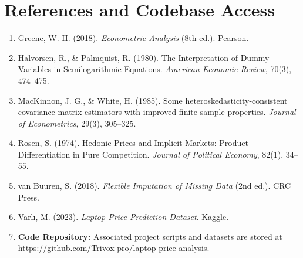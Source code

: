 \documentclass[11pt, a4paper]{article}
\begin{document}
\section{References and Codebase Access}

\begin{enumerate}
    \item Greene, W. H. (2018). \textit{Econometric Analysis} (8th ed.). Pearson.
    \item Halvorsen, R., \& Palmquist, R. (1980). The Interpretation of Dummy Variables in Semilogarithmic Equations. \textit{American Economic Review}, 70(3), 474--475.
    \item MacKinnon, J. G., \& White, H. (1985). Some heteroskedasticity-consistent covariance matrix estimators with improved finite sample properties. \textit{Journal of Econometrics}, 29(3), 305--325.
    \item Rosen, S. (1974). Hedonic Prices and Implicit Markets: Product Differentiation in Pure Competition. \textit{Journal of Political Economy}, 82(1), 34--55.
    \item van Buuren, S. (2018). \textit{Flexible Imputation of Missing Data} (2nd ed.). CRC Press.
    \item Varlı, M. (2023). \textit{Laptop Price Prediction Dataset}. Kaggle.
    \item \textbf{Code Repository:} Associated project scripts and datasets are stored at \url{https://github.com/Trivox-pro/laptop-price-analysis}.
\end{enumerate}
\end{document}
